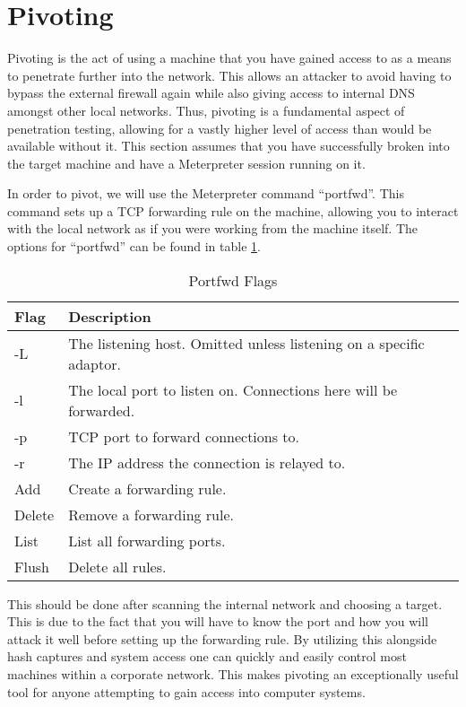 	\section{Pivoting}
		Pivoting is the act of using a machine that you have gained access to as a means to penetrate further into the network. 
		This allows an attacker to avoid having to bypass the external firewall again while also giving access to internal DNS amongst other local networks. 
		Thus, pivoting is a fundamental aspect of penetration testing, allowing for a vastly higher level of access than would be available without it. 
		This section assumes that you have successfully broken into the target machine and have a Meterpreter session running on it. 
	
		In order to pivot, we will use the Meterpreter command ``portfwd''.
		This command sets up a TCP forwarding rule on the machine, allowing you to interact with the local network as if you were working from the machine itself. 
		The options for ``portfwd'' can be found in table \ref{tab:portfwdFlags}.
		\begin{table}[htb]
			\centering
				\begin{adjustbox}{max width=1\textwidth}
			\begin{tabular}{| l | l |}
				\hline
				\textbf{Flag} & \textbf{Description} \\ \hline
				-L & The listening host. Omitted unless listening on a specific adaptor.\\ \hline
				-l & The local port to listen on. Connections here will be forwarded. \\ \hline
				-p & TCP port to forward connections to. \\ \hline
				-r & The IP address the connection is relayed to. \\ \hline
				Add & Create a forwarding rule. \\ \hline
				Delete & Remove a forwarding rule. \\ \hline
				List & List all forwarding ports. \\ \hline
				Flush & Delete all rules. \\ \hline
			\end{tabular}
		\end{adjustbox}
			\caption{Portfwd Flags}
			\label{tab:portfwdFlags}
		\end{table}
		This should be done after scanning the internal network and choosing a target. 
		This is due to the fact that you will have to know the port and how you will attack it well before setting up the forwarding rule. 
		By utilizing this alongside hash captures and system access one can quickly and easily control most machines within a corporate network. 
		This makes pivoting an exceptionally useful tool for anyone attempting to gain access into computer systems. 

